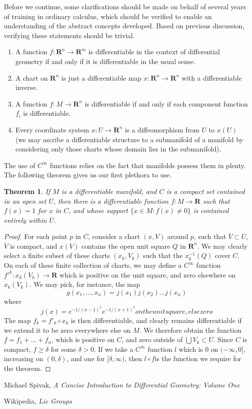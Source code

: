 \documentclass[12pt]{report}
\theoremstyle{plain}
\newtheorem{theorem}{Theorem}[chapter]
\theoremstyle{definition}
\begin{document}
Before we continue, some clarifications should be made on behalf of several years of training in ordinary calculus, which should be verified to enable an understanding of the abstract concepts developed. Based on previous discussion, verifying these statements should be trivial.

\begin{enumerate}
    \item A function $f: \mathbf{R}^n \to \mathbf{R}^m$ is differentiable in the context of differential geometry if and only if it is differentiable in the usual sense.
    \item A chart on $\mathbf{R}^n$ is just a differentiable map $x: \mathbf{R}^n \to \mathbf{R}^n$ with a differentiable inverse.
    \item A function $f: M \to \mathbf{R}^n$ is differentiable if and only if each component function $f_i$ is differentiable.
    \item Every coordinate system $x:U \to \mathbf{R}^n$ is a diffeomorphism from $U$ to $x(U)$ (we may ascribe a differentiable structure to a submanifold of a manifold by considering only those charts whose domain lies in the submanifold).
\end{enumerate}

The use of $C^\infty$ functions relies on the fact that manifolds possess them in plenty. The following theorem gives us our first plethora to use.

\begin{theorem}
        If $M$ is a differentiable manifold, and $C$ is a compact set contained in an open set $U$, then there is a differentiable function $f:M \to \mathbf{R}$ such that $f(x) = 1$ for $x$ in $C$, and whose support $\overline{\{ x \in M : f(x) \neq 0 \}}$ is contained entirely within $U$.
    \end{theorem}
    \begin{proof}
        For each point $p$ in $C$, consider a chart $(x,V)$ around $p$, such that $\overline{V} \subset U$, $\overline{V}$ is compact, and $x(V)$ contains the open unit square $Q$ in $\mathbf{R}^n$. We may clearly select a finite subset of these charts $(x_k,V_k)$ such that the $x_k^{-1}(Q)$ cover $C$. On each of these finite collection of charts, we may define a $C^\infty$ function $f'^k:x_k(V_k) \to \mathbf{R}$ which is positive on the unit square, and zero elsewhere on $x_k(V_k)$. We may pick, for instance, the map
        \[ g(x_1, \dots, x_n) = j(x_1)j(x_2)\dots j(x_n) \]
        where
        \[ j(x) = e^{-1/(x-1)^2} e^{-1/(x+1)^2} on the unit square, else zero \]
        The map $f_k = f'_k \circ x_k$ is then differentiable, and clearly remains differentiable if we extend it to be zero everywhere else on $M$. We therefore obtain the function $f = f_1 + \dots + f_n$, which is positive on $C$, and zero outside of $\bigcup V_k \subset U$. Since $C$ is compact, $f \geq \delta$ for some $\delta > 0$. If we take a $C^\infty$ function $l$ which is 0 on $(-\infty, 0]$, increasing on $(0,\delta)$, and one for $[\delta, \infty)$, then $l \circ f$is the function we require for the theorem.
    \end{proof}

\begin{thebibliography}{10}
     Michael Spivak,
    \emph{A Concise Introduction to Differential Geometry: Volume One}

     Wikipedia,
    \emph{Lie Groups}
\end{thebibliography}
\end{document}
